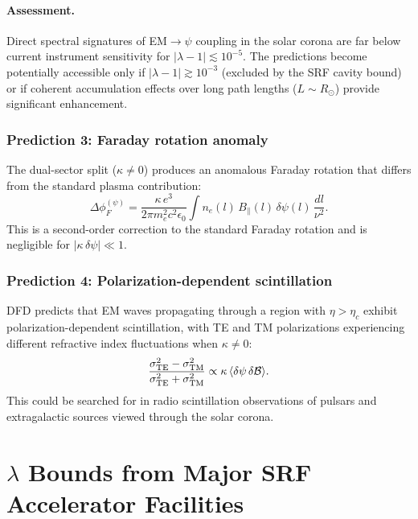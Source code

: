 \documentclass[aps,prd,twocolumn,superscriptaddress,floatfix,nofootinbib]{revtex4-2}
\newcommand{\lam}{\lambda}
\newcommand{\kap}{\kappa}
\newcommand{\Rsun}{R_\odot}
\newcommand{\calB}{\mathcal{B}}
\begin{document}
\paragraph{Assessment.}
Direct spectral signatures of EM$\to\psi$ coupling in the solar corona
are far below current instrument sensitivity for
$|\lam-1| \lesssim 10^{-5}$. The predictions become potentially
accessible only if $|\lam-1| \gtrsim 10^{-3}$ (excluded by the SRF
cavity bound) or if coherent accumulation effects over long path
lengths ($L \sim \Rsun$) provide significant enhancement.

\subsubsection{Prediction 3: Faraday rotation anomaly}

The dual-sector split ($\kappa \neq 0$) produces an anomalous Faraday
rotation that differs from the standard plasma contribution:
\begin{equation}
\Delta\phi_F^{(\psi)} = \frac{\kap\,e^3}{2\pi m_e^2 c^2\epsilon_0}
\int n_e(l)\,B_\|(l)\,\delta\psi(l)\,\frac{dl}{\nu^2}.
\end{equation}
This is a second-order correction to the standard Faraday rotation
and is negligible for $|\kap\,\delta\psi| \ll 1$.

\subsubsection{Prediction 4: Polarization-dependent scintillation}

DFD predicts that EM waves propagating through a region with
$\eta > \eta_c$ exhibit polarization-dependent scintillation, with
TE and TM polarizations experiencing different refractive index
fluctuations when $\kappa \neq 0$:
\begin{equation}
\frac{\sigma_{\rm TE}^2 - \sigma_{\rm TM}^2}
{\sigma_{\rm TE}^2 + \sigma_{\rm TM}^2}
\propto \kap\,\langle\delta\psi\,\delta\calB\rangle.
\end{equation}
This could be searched for in radio scintillation observations of
pulsars and extragalactic sources viewed through the solar corona.


\section{$\lambda$ Bounds from Major SRF Accelerator
Facilities}\label{sec:srf}
\end{document}
